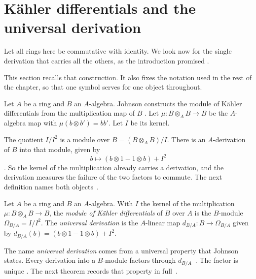 \section{Kähler differentials and the universal derivation}\label{sec:commutative:kahler}

Let all rings here be commutative with identity. We look now for the single
derivation that carries all the others, as the introduction promised
\cite[p.~93]{Johnson1969Kahler}.

This section recalls that construction. It also fixes the notation used in
the rest of the chapter, so that one symbol serves for one object throughout.

Let $A$ be a ring and $B$ an $A$-algebra. Johnson constructs the module of
Kähler differentials from the multiplication map of $B$
\cite[p.~93]{Johnson1969Kahler}. Let $\mu\colon B\otimes_A B \to B$ be the
$A$-algebra map with $\mu(b\otimes b') = bb'$. Let $I$ be its kernel.

The quotient $I/I^2$ is a module over $B = (B\otimes_A B)/I$. There is an
$A$-derivation of $B$ into that module, given by
\[
  b \longmapsto (b\otimes 1 - 1\otimes b) + I^2
\]
\cite[p.~93]{Johnson1969Kahler}. So the kernel of the multiplication already
carries a derivation, and the derivation measures the failure of the two
factors to commute. The next definition names both
objects~\cite[p.~93]{Johnson1969Kahler}.

\begin{definition}\label{def:comm:kahler}
Let $A$ be a ring and $B$ an $A$-algebra. With $I$ the kernel of the
multiplication $\mu\colon B\otimes_A B\to B$, the \emph{module of Kähler
differentials} of $B$ over $A$ is the $B$-module
$\Omega_{B/A} = I/I^2$. The \emph{universal derivation} is the $A$-linear map
$d_{B/A}\colon B \to \Omega_{B/A}$ given by
$d_{B/A}(b) = (b\otimes 1 - 1\otimes b) + I^2$.
\end{definition}

The name \emph{universal derivation} comes from a universal property that
Johnson states. Every derivation into a $B$-module factors through
$d_{B/A}$~\cite[p.~92]{Johnson1969Kahler}. The factor is unique
\cite[p.~92]{Johnson1969Kahler}. The next theorem records that property in
full~\cite[p.~92]{Johnson1969Kahler}.

